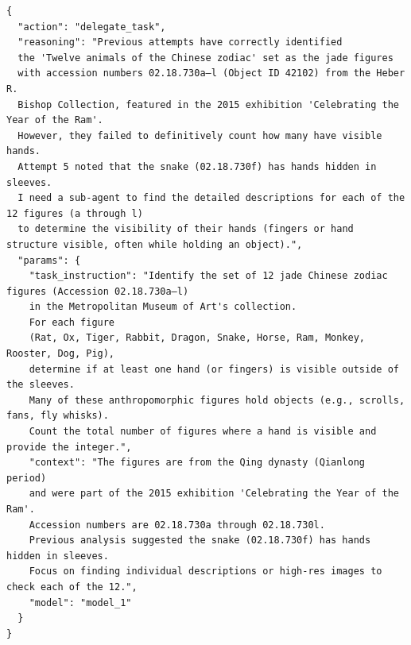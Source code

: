 \begin{tcolorbox}[
  title={\textbf{\small Attempt 6 - Main Decision}},
  boxrule=1pt,
  arc=0mm,
  colback=gray!5,
  colframe=gray!70,
  breakable,
  before skip=10pt,
  after skip=10pt,
  pad at break=2mm,
  parbox=false
]
\begin{verbatim}
{
  "action": "delegate_task",
  "reasoning": "Previous attempts have correctly identified 
  the 'Twelve animals of the Chinese zodiac' set as the jade figures 
  with accession numbers 02.18.730a–l (Object ID 42102) from the Heber R. 
  Bishop Collection, featured in the 2015 exhibition 'Celebrating the Year of the Ram'. 
  However, they failed to definitively count how many have visible hands.
  Attempt 5 noted that the snake (02.18.730f) has hands hidden in sleeves. 
  I need a sub-agent to find the detailed descriptions for each of the 12 figures (a through l) 
  to determine the visibility of their hands (fingers or hand structure visible, often while holding an object).",
  "params": {
    "task_instruction": "Identify the set of 12 jade Chinese zodiac figures (Accession 02.18.730a–l)
    in the Metropolitan Museum of Art's collection. 
    For each figure 
    (Rat, Ox, Tiger, Rabbit, Dragon, Snake, Horse, Ram, Monkey, Rooster, Dog, Pig),
    determine if at least one hand (or fingers) is visible outside of the sleeves. 
    Many of these anthropomorphic figures hold objects (e.g., scrolls, fans, fly whisks).
    Count the total number of figures where a hand is visible and provide the integer.",
    "context": "The figures are from the Qing dynasty (Qianlong period) 
    and were part of the 2015 exhibition 'Celebrating the Year of the Ram'.
    Accession numbers are 02.18.730a through 02.18.730l. 
    Previous analysis suggested the snake (02.18.730f) has hands hidden in sleeves. 
    Focus on finding individual descriptions or high-res images to check each of the 12.",
    "model": "model_1"
  }
}
\end{verbatim}
\end{tcolorbox}

